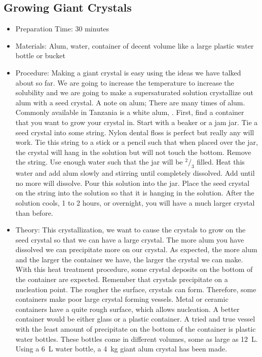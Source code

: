 \subsection{Growing Giant Crystals}
\begin{itemize}
\item{Preparation Time: 30 minutes}
\item{Materials: Alum, water, container of decent volume like a large plastic water bottle or bucket}
\item{Procedure: Making a giant crystal is easy using the ideas we have talked about so far. We are going to increase the temperature to increase the solubility and we are going to make a supersaturated solution crystallize out alum with a seed crystal. A note on alum; There are many times of alum. Commonly available in Tanzania is a white alum, . First, find a container that you want to grow your crystal in. Start with a beaker or a jam jar. Tie a seed crystal into some string. Nylon dental floss is perfect but really any will work. Tie this string to a stick or a pencil such that when placed over the jar, the crystal will hang in the solution but will not touch the bottom. Remove the string. Use enough water such that the jar will be $^2/_3$ filled. Heat this water and add alum slowly and stirring until completely dissolved. Add until no more will dissolve. Pour this solution into the jar. Place the seed crystal on the string into the solution so that it is hanging in the solution. After the solution cools, 1 to 2 hours, or overnight, you will have a much larger crystal than before.}
\item{Theory: This crystallization, we want to cause the crystals to grow on the seed crystal so that we can have a large crystal. The more alum you have dissolved we can precipitate more on our crystal. As expected, the more alum and the larger the container we have, the larger the crystal we can make. With this heat treatment procedure, some crystal deposits on the bottom of the container are expected. Remember that crystals precipitate on a nucleation point. The rougher the surface, crystals can form. Therefore, some containers make poor large crystal forming vessels. Metal or ceramic containers have a quite rough surface, which allows nucleation. A better container would be either glass or a plastic container. A tried and true vessel with the least amount of precipitate on the bottom of the container is plastic water bottles. These bottles come in different volumes, some as large as 12~L. Using a 6~L water bottle, a 4~kg giant alum crystal has been made.\\
}
\end{itemize}

